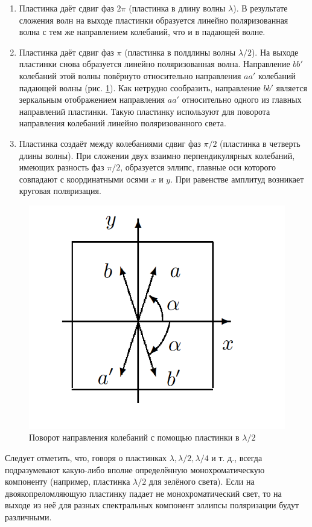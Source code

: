 \documentclass[a4paper,12pt]{article}
\begin{document}
\begin{enumerate}[label=\alph*)]
	
	\item Пластинка даёт сдвиг фаз $ 2\pi $ (пластинка в длину волны $ \lambda $). В результате сложения волн на выходе пластинки образуется линейно поляризованная волна с тем же направлением колебаний, что и в падающей волне.
	
	\item Пластинка даёт сдвиг фаз $ \pi $ (пластинка в полдлины волны $ \lambda / 2 $). На выходе пластинки снова образуется линейно поляризованная волна. Направление $ bb' $ колебаний этой волны повёрнуто относительно направления $ aa' $ колебаний падающей волны (рис. \ref{ris 2}). Как нетрудно сообразить, направление $ bb' $ является зеркальным отображением направления $ aa' $ относительно одного из главных направлений пластинки. Такую пластинку используют для поворота направления колебаний линейно поляризованного света.
	
	\item Пластинка создаёт между колебаниями сдвиг фаз $ \pi/2 $ (пластинка
	в четверть длины волны). При сложении двух взаимно перпендикулярных колебаний, имеющих разность фаз $ \pi/2 $, образуется эллипс, главные оси которого совпадают с координатными осями $ x $ и $ y $. При равенстве амплитуд возникает круговая поляризация.
	
\end{enumerate}

\begin{figure}[h] 
	\centering
	\includegraphics[width=0.3\linewidth]{2}
	\caption{Поворот направления колебаний с помощью пластинки в $ \lambda / 2 $}
	\label{ris 2}
\end{figure}

Следует отметить, что, говоря о пластинках $ \lambda , \lambda/2, \lambda/4  $ и т. д., всегда подразумевают какую-либо вполне определённую монохроматическую
компоненту (например, пластинка $ \lambda/2 $ для зелёного света). Если на двоякопреломляющую пластинку падает не монохроматический свет, то на
выходе из неё для разных спектральных компонент эллипсы поляризации будут различными.
\end{document}
